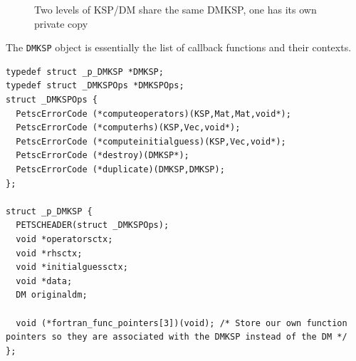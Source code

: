 \begin{figure}[hbt]
\centering
{}
  \caption{Two levels of KSP/DM share the same DMKSP, one has its own private copy}
\label{fig_dmksp2}
\end{figure}

The \lstinline{DMKSP} object is essentially the list of callback functions and their contexts.
\begin{lstlisting}
typedef struct _p_DMKSP *DMKSP;
typedef struct _DMKSPOps *DMKSPOps;
struct _DMKSPOps {
  PetscErrorCode (*computeoperators)(KSP,Mat,Mat,void*);
  PetscErrorCode (*computerhs)(KSP,Vec,void*);
  PetscErrorCode (*computeinitialguess)(KSP,Vec,void*);
  PetscErrorCode (*destroy)(DMKSP*);
  PetscErrorCode (*duplicate)(DMKSP,DMKSP);
};

struct _p_DMKSP {
  PETSCHEADER(struct _DMKSPOps);
  void *operatorsctx;
  void *rhsctx;
  void *initialguessctx;
  void *data;
  DM originaldm;

  void (*fortran_func_pointers[3])(void); /* Store our own function pointers so they are associated with the DMKSP instead of the DM */
};
\end{lstlisting}

